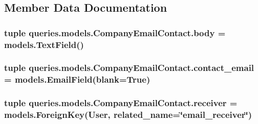 \subsection{Member Data Documentation}
\hypertarget{classqueries_1_1models_1_1_company_email_contact_a18e8a88d9cff26bf7ae63a00dfad7d0f}{
\subsubsection[{body}]{\setlength{\rightskip}{0pt plus 5cm}tuple queries.\-models.\-Company\-Email\-Contact.\-body = models.\-Text\-Field()\hspace{0.3cm}{\ttfamily [static]}}}\label{classqueries_1_1models_1_1_company_email_contact_a18e8a88d9cff26bf7ae63a00dfad7d0f}
\hypertarget{classqueries_1_1models_1_1_company_email_contact_a96aeebf246ff40a5290fa98ffd70875e}{
\subsubsection[{contact\-\_\-email}]{\setlength{\rightskip}{0pt plus 5cm}tuple queries.\-models.\-Company\-Email\-Contact.\-contact\-\_\-email = models.\-Email\-Field(blank=True)\hspace{0.3cm}{\ttfamily [static]}}}\label{classqueries_1_1models_1_1_company_email_contact_a96aeebf246ff40a5290fa98ffd70875e}
\hypertarget{classqueries_1_1models_1_1_company_email_contact_a0b1727e6533da70429aca93a52511d8e}{
\subsubsection[{receiver}]{\setlength{\rightskip}{0pt plus 5cm}tuple queries.\-models.\-Company\-Email\-Contact.\-receiver = models.\-Foreign\-Key(User, related\-\_\-name=\char`\"{}email\-\_\-receiver\char`\"{})\hspace{0.3cm}{\ttfamily [static]}}}\label{classqueries_1_1models_1_1_company_email_contact_a0b1727e6533da70429aca93a52511d8e}

